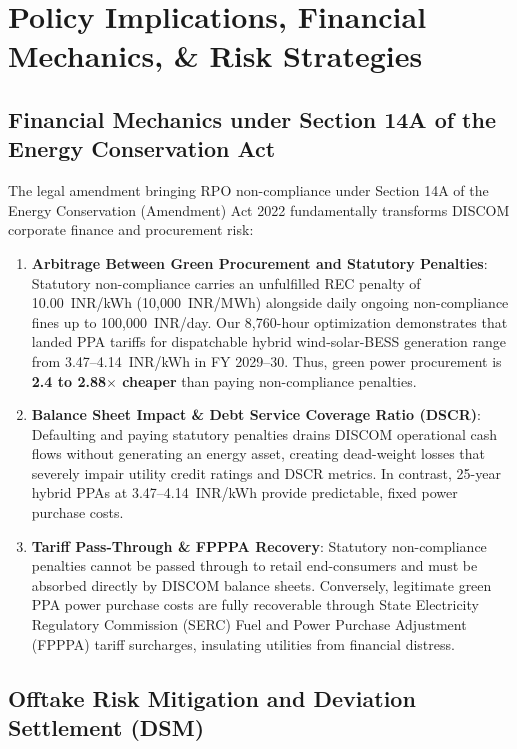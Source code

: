 \documentclass[11pt,a4paper]{article}
\begin{document}
\section{Policy Implications, Financial Mechanics, \& Risk Strategies}
\label{sec:policy}

\subsection{Financial Mechanics under Section 14A of the Energy Conservation Act}
\label{sec:fin_mechanics}

The legal amendment bringing RPO non-compliance under Section 14A of the Energy Conservation (Amendment) Act 2022 fundamentally transforms DISCOM corporate finance and procurement risk:

\begin{enumerate}
    \item \textbf{Arbitrage Between Green Procurement and Statutory Penalties}: Statutory non-compliance carries an unfulfilled REC penalty of 10.00~INR/kWh (10,000~INR/MWh) alongside daily ongoing non-compliance fines up to 100,000~INR/day. Our 8,760-hour optimization demonstrates that landed PPA tariffs for dispatchable hybrid wind-solar-BESS generation range from 3.47--4.14~INR/kWh in FY 2029--30. Thus, green power procurement is \textbf{2.4 to 2.88$\times$ cheaper} than paying non-compliance penalties.
    \item \textbf{Balance Sheet Impact \& Debt Service Coverage Ratio (DSCR)}: Defaulting and paying statutory penalties drains DISCOM operational cash flows without generating an energy asset, creating dead-weight losses that severely impair utility credit ratings and DSCR metrics. In contrast, 25-year hybrid PPAs at 3.47--4.14~INR/kWh provide predictable, fixed power purchase costs.
    \item \textbf{Tariff Pass-Through \& FPPPA Recovery}: Statutory non-compliance penalties cannot be passed through to retail end-consumers and must be absorbed directly by DISCOM balance sheets. Conversely, legitimate green PPA power purchase costs are fully recoverable through State Electricity Regulatory Commission (SERC) Fuel and Power Purchase Adjustment (FPPPA) tariff surcharges, insulating utilities from financial distress.
\end{enumerate}

\subsection{Offtake Risk Mitigation and Deviation Settlement (DSM)}
\label{sec:offtake_risk}
\end{document}
